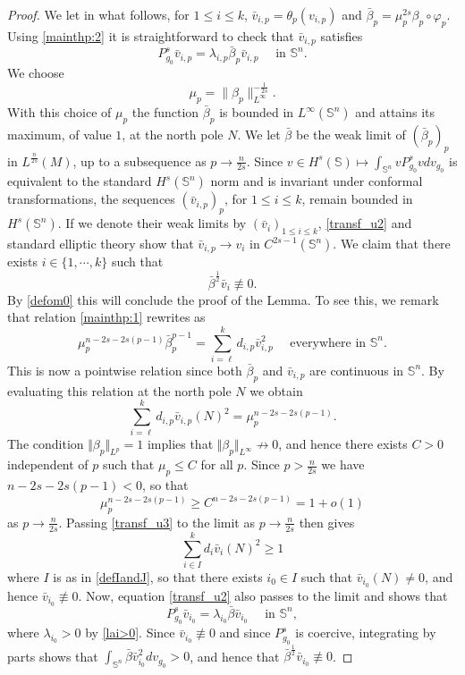 \documentclass[10pt]{amsart}
\numberwithin{equation}{section}
\newcommand{\vp}{\varphi}
\theoremstyle{plain}
\theoremstyle{remark}
\begin{document}
\begin{proof}
We let in what follows, for $1 \le i \le k$, $\bar{v}_{i,p} = \theta_p(v_{i,p})$ and $\bar{\beta}_p = \mu_p^{2s} \beta_p\circ \vp_p$.  Using \eqref{mainthp:2} it is straightforward to check that $\bar{v}_{i,p}$ satisfies
\begin{equation} \label{transf_u2}
P_{g_0}^s \bar{v}_{i,p} = \lambda_{i,p} \bar{\beta}_p \bar{v}_{i,p} \quad \text{ in } \mathbb{S}^n.
\end{equation}
We choose
$$\mu_p= \|\beta_p \|_{L^\infty}^{-\frac{1}{2s}}.$$
With this choice of $\mu_p$ the function $\bar{\beta}_p$ is bounded in $L^\infty(\mathbb{S}^n)$ and attains its maximum, of value $1$, at the north pole $N$. We let $\bar{\beta}$ be the weak limit of $(\bar{\beta}_p)_p$ in $L^{\frac{n}{2s}}(M)$, up to a subsequence as $p \to \frac{n}{2s}$. Since $v \in H^s(\mathbb{S}) \mapsto \int_{\mathbb{S}^n} v P_{g_0}^s v dv_{g_0}$ is equivalent to the standard $H^s(\mathbb{S}^n)$ norm and is invariant under conformal transformations, the sequences $(\bar{v}_{i,p})_p$, for $1 \le i \le k$, remain bounded in $H^s(\mathbb{S}^n)$. If we denote their weak limits by $(\bar{v}_i)_{1 \le i \le k}$, \eqref{transf_u2} and standard elliptic theory show that $\bar{v}_{i,p} \to v_i$ in $C^{2s-1}(\mathbb{S}^n)$. 
 We claim that  there exists $i \in \{1,\cdots,k\}$ such that 
 $$\bar{\beta}^{\frac12} \bar{v}_i \not \equiv0.$$
 By \eqref{defom0} this will conclude the proof of the Lemma. To see this, we remark that relation \eqref{mainthp:1} rewrites as 
 $$ \mu_p^{n-2s-2s(p-1)} \bar{\beta}_p^{p-1} = \sum_{i=\ell}^k d_{i,p} \bar{v}_{i,p}^2 \quad \text{ everywhere in } \mathbb{S}^n. $$
This is now a pointwise relation since both $\bar{\beta}_p$ and $\bar{v}_{i,p}$ are continuous in $\mathbb{S}^n$. By evaluating this relation at the north pole $N$ we obtain
\begin{equation}  \label{transf_u3}
 \sum_{i=\ell}^k d_{i,p} \bar{v}_{i,p}(N)^2 =\mu_p^{n-2s-2s(p-1)} . 
 \end{equation}
The condition $\Vert \beta_p \Vert_{L^p} = 1$ implies that $\Vert \beta_p \Vert_{L^\infty} \not \to 0$, and hence there exists $C >0$ independent of $p$ such that $\mu_p \le C$ for all $p$. Since $p > \frac{n}{2s}$ we have $n-2s-2s(p-1) <0$, so that 
$$ \mu_p^{n-2s-2s(p-1)} \ge C^{n-2s-2s(p-1)} = 1 + o(1) $$ 
as $p \to \frac{n}{2s}$. Passing \eqref{transf_u3} to the limit as $p \to \frac{n}{2s}$ then gives 
$$   \sum_{i\in I}^k d_{i} \bar{v}_{i}(N)^2 \ge 1 $$
 where $I$ is as in \eqref{defIandJ}, so that there exists $i_0 \in I$ such that $\bar{v}_{i_0} (N) \neq 0$, and hence $\bar{v}_{i_0} \not \equiv 0$. Now, equation \eqref{transf_u2} also passes to the limit and shows that 
 $$ P_{g_0}^s \bar{v}_{i_0} = \lambda_{i_0} \bar{\beta} \bar{v}_{i_0} \quad \text{ in } \mathbb{S}^n, $$
where $\lambda_{i_0} >0$ by \eqref{lai>0}. Since $ \bar{v}_{i_0} \not \equiv 0$ and since $P_{g_0}^s$ is coercive, integrating by parts shows that $\int_{\mathbb{S}^n} \bar{\beta}\bar{v}_{i_0}^2 dv_{g_0} >0$, and hence that $\bar{\beta}^{\frac12} \bar{v}_{i_0} \not \equiv0$.
\end{proof} 
\end{document}
